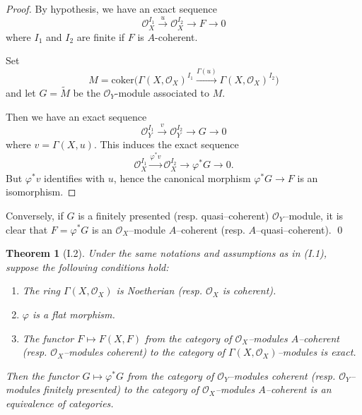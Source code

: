 \documentclass[a4paper]{amsart}
\newtheorem{theorem}{Theorem}[section]
\theoremstyle{definition}
\theoremstyle{definition}
\begin{document}
\begin{proof}
By hypothesis, we have an exact sequence
\[
\mathcal{O}_X^{I_1} \xrightarrow{u} \mathcal{O}_X^{I_2} \longrightarrow F \longrightarrow 0
\]
where $I_1$ and $I_2$ are finite if $F$ is $A$\nobreakdash-coherent.  

Set
\[
M = \mathrm{coker}\big( \Gamma(X, \mathcal{O}_X)^{I_1} \xrightarrow{\Gamma(u)} \Gamma(X, \mathcal{O}_X)^{I_2} \big)
\]
and let $G = \widetilde{M}$ be the $\mathcal{O}_Y$-module associated to $M$.

Then we have an exact sequence
\[
\mathcal{O}_Y^{I_1} \xrightarrow{v} \mathcal{O}_Y^{I_2} \longrightarrow G \longrightarrow 0
\]
where $v = \Gamma(X, u)$. This induces the exact sequence
\[
\mathcal{O}_X^{I_1} \xrightarrow{\varphi^{\ast} v} \mathcal{O}_X^{I_2} \longrightarrow \varphi^{\ast} G \longrightarrow 0.
\]
But $\varphi^{\ast} v$ identifies with $u$, hence the canonical morphism $\varphi^{\ast} G \to F$ is an isomorphism.
\end{proof}




\noindent
Conversely, if $G$ is a finitely presented (resp. quasi–coherent) $\mathcal{O}_Y$–module, it is clear that $F = \varphi^* G$ is an $\mathcal{O}_X$–module $A$–coherent (resp. $A$–quasi–coherent).
\qed

\begin{theorem}[I.2]
Under the same notations and assumptions as in (I.1), suppose the following conditions hold:
\begin{enumerate}
\item The ring $\Gamma(X, \mathcal{O}_X)$ is Noetherian (resp. $\mathcal{O}_X$ is coherent).
\item $\varphi$ is a flat morphism.
\item The functor $F \mapsto F(X, F)$ from the category of $\mathcal{O}_X$–modules $A$–coherent (resp. $\mathcal{O}_X$–modules coherent) to the category of $\Gamma(X, \mathcal{O}_X)$–modules is exact.
\end{enumerate}
Then the functor $G \mapsto \varphi^* G$ from the category of $\mathcal{O}_Y$–modules coherent (resp. $\mathcal{O}_Y$–modules finitely presented) to the category of $\mathcal{O}_X$–modules $A$–coherent is an equivalence of categories.
\end{theorem}
\end{document}
